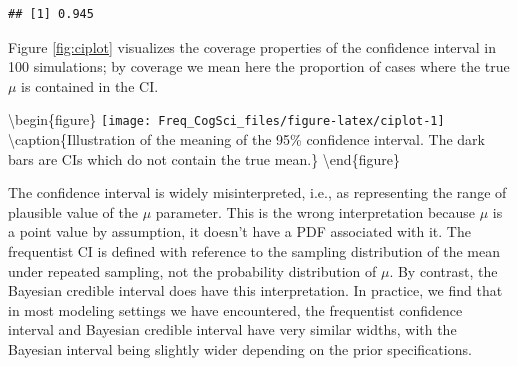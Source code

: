 \documentclass[12pt,]{krantz}
\newenvironment{Shaded}{\begin{snugshade}}{\end{snugshade}}
\newcommand{\CommentTok}[1]{\textcolor[rgb]{0.56,0.35,0.01}{\textit{#1}}}
\newcommand{\ControlFlowTok}[1]{\textcolor[rgb]{0.13,0.29,0.53}{\textbf{#1}}}
\newcommand{\DataTypeTok}[1]{\textcolor[rgb]{0.13,0.29,0.53}{#1}}
\newcommand{\DecValTok}[1]{\textcolor[rgb]{0.00,0.00,0.81}{#1}}
\newcommand{\KeywordTok}[1]{\textcolor[rgb]{0.13,0.29,0.53}{\textbf{#1}}}
\newcommand{\NormalTok}[1]{#1}
\newcommand{\OperatorTok}[1]{\textcolor[rgb]{0.81,0.36,0.00}{\textbf{#1}}}
\newcommand{\OtherTok}[1]{\textcolor[rgb]{0.56,0.35,0.01}{#1}}
\newcommand{\StringTok}[1]{\textcolor[rgb]{0.31,0.60,0.02}{#1}}
\begin{document}
\begin{Shaded}
\end{Shaded}

\begin{verbatim}
## [1] 0.945
\end{verbatim}

Figure \ref{fig:ciplot} visualizes the coverage properties of the confidence interval in 100 simulations; by coverage we mean here the proportion of cases where the true \(\mu\) is contained in the CI.

\textbackslash{}begin\{figure\}
\texttt{[image: Freq\_CogSci\_files/figure-latex/ciplot-1]} \textbackslash{}caption\{Illustration of the meaning of the 95\% confidence interval. The dark bars are CIs which do not contain the true mean.\}\label{fig:ciplot}
\textbackslash{}end\{figure\}

The confidence interval is widely misinterpreted, i.e., as representing the range of plausible value of the \(\mu\) parameter. This is the wrong interpretation because \(\mu\) is a point value by assumption, it doesn't have a PDF associated with it. The frequentist CI is defined with reference to the sampling distribution of the mean under repeated sampling, not the probability distribution of \(\mu\).
By contrast, the Bayesian credible interval does have this interpretation.
In practice, we find that in most modeling settings we have encountered, the frequentist confidence interval and Bayesian credible interval have very similar widths, with the Bayesian interval being slightly wider depending on the prior specifications.
\end{document}
